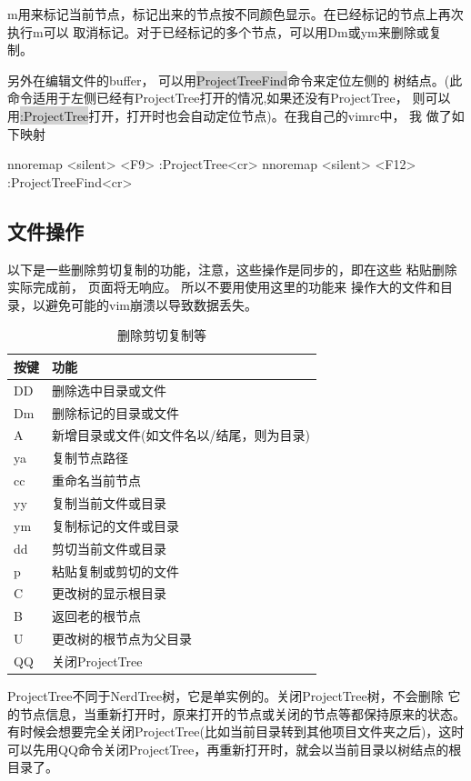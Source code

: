 \documentclass[oneside,openany]{book}
\begin{document}
  m用来标记当前节点，标记出来的节点按不同颜色显示。在已经标记的节点上再次执行m可以
取消标记。对于已经标记的多个节点，可以用Dm或ym来删除或复制。

  另外在编辑文件的buffer， 可以用\colorbox{lightgray}{ProjectTreeFind}命令来定位左侧的
树结点。(此命令适用于左侧已经有ProjectTree打开的情况,如果还没有ProjectTree，
则可以用\colorbox{lightgray}{:ProjectTree}打开，打开时也会自动定位节点)。在我自己的vimrc中， 我
做了如下映射
  \begin{mdframed}[style=SmallFrame]
    \begin{flushleft}
      nnoremap <silent> <F9>  :ProjectTree<cr>\newline
      nnoremap <silent> <F12> :ProjectTreeFind<cr>
    \end{flushleft}
  \end{mdframed}

  \subsection{文件操作}
  以下是一些删除剪切复制的功能，注意，这些操作是同步的，即在这些
粘贴删除实际完成前， 页面将无响应。 所以不要用使用这里的功能来
操作大的文件和目录，以避免可能的vim崩溃以导致数据丢失。
  \begin{table}[H]
  \caption{删除剪切复制等}
  \centering
      \begin{tabular}{p{40pt}p{220pt}}
        \toprule
        按键& 功能\\
        \midrule
          DD    &删除选中目录或文件\\
          Dm    &删除标记的目录或文件\\
          A     &新增目录或文件(如文件名以/结尾，则为目录)\\
          ya    &复制节点路径\\
          cc    &重命名当前节点\\
          yy    &复制当前文件或目录\\
          ym    &复制标记的文件或目录\\
          dd    &剪切当前文件或目录\\
          p     &粘贴复制或剪切的文件\\
          C     &更改树的显示根目录\\
          B     &返回老的根节点\\
          U     &更改树的根节点为父目录\\
          QQ    &关闭ProjectTree\\
        \bottomrule
      \end{tabular}
  \end{table}
  ProjectTree不同于NerdTree树，它是单实例的。关闭ProjectTree树，不会删除
它的节点信息，当重新打开时，原来打开的节点或关闭的节点等都保持原来的状态。
有时候会想要完全关闭ProjectTree(比如当前目录转到其他项目文件夹之后)，这时
可以先用QQ命令关闭ProjectTree，再重新打开时，就会以当前目录以树结点的根目录了。
\end{document}
